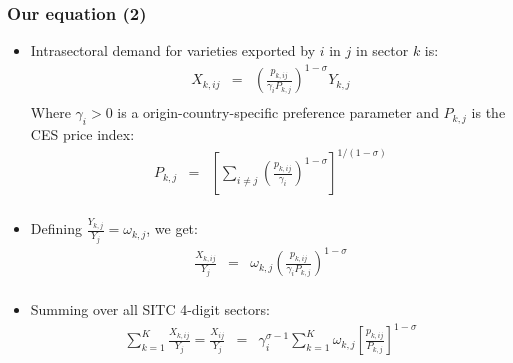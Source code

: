 \documentclass{beamer}
\begin{document}
\begin{frame}[plain]\frametitle{Our equation (2)}
\begin{itemize}
\item Intrasectoral demand for varieties exported by $i$ in $j$ in sector $k$ is: 
\[\begin{array}{*{35}{l}}
{{X}_{k,ij}} & = & {{\left( \frac{{{p}_{k,ij}}}{{{\gamma }_{i}}{{P}_{k,j}}} \right)}^{1-\sigma }}{{Y}_{k,j}}  \\
\end{array}\]
Where ${{\gamma }_{i}}>0$ is a origin-country-specific preference parameter and ${{P}_{k,j}}$ is the CES price index:
\[\begin{array}{*{35}{l}}
{{P}_{k,j}} & = & {{\left[ \sum\limits_{i\ne j}{{{\left( \frac{{{p}_{k,ij}}}{{{\gamma }_{i}}} \right)}^{1-\sigma }}} \right]}^{1/(1-\sigma )}}  \\
\end{array}\]
\item Defining $\frac{{{Y}_{k,j}}}{{{Y}_{j}}}={{\omega }_{k,j}}$, we get: 
\[\begin{array}{*{35}{l}}
\frac{{{X}_{k,ij}}}{{{Y}_{j}}} & = & {{\omega }_{k,j}}{{\left( \frac{{{p}_{k,ij}}}{{{\gamma }_{i}}{{P}_{k,j}}} \right)}^{1-\sigma }}  \\
\end{array}\]
\item Summing over all SITC 4-digit sectors: 
\[\begin{array}{*{35}{l}}
\sum\limits_{k=1}^{K}{\frac{{{X}_{k,ij}}}{{{Y}_{j}}}}=\frac{{{X}_{ij}}}{{{Y}_{j}}} & = & \gamma _{i}^{\sigma -1}\sum\limits_{k=1}^{K}{{{\omega }_{k,j}}}{{\left[ \frac{{{p}_{k,ij}}}{{{P}_{k,j}}} \right]}^{1-\sigma }}  \\
\end{array}\]
\end{itemize}
\end{frame}
\end{document}
